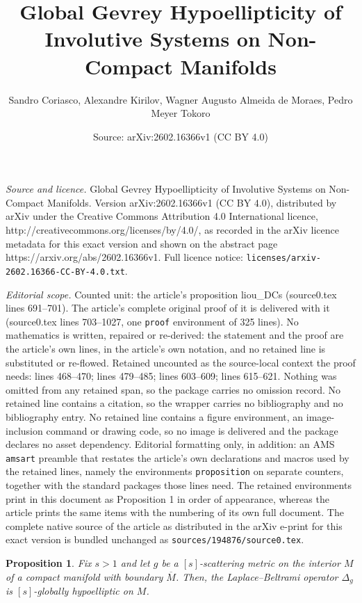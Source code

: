 \documentclass[10pt,a4paper]{amsart}
\title{Global Gevrey Hypoellipticity of Involutive Systems on Non-Compact Manifolds}
\author{Sandro Coriasco, Alexandre Kirilov, Wagner Augusto Almeida de Moraes, Pedro Meyer Tokoro}
\date{Source: arXiv:2602.16366v1 (CC BY 4.0)}
\newtheorem{proposition}{Proposition}
\begin{document}
\maketitle

\noindent\emph{Source and licence.} Global Gevrey Hypoellipticity of Involutive Systems on Non-Compact Manifolds. Version arXiv:2602.16366v1 (CC BY 4.0), distributed by arXiv under the Creative Commons Attribution 4.0 International licence, http://creativecommons.org/licenses/by/4.0/, as recorded in the arXiv licence metadata for this exact version and shown on the abstract page https://arxiv.org/abs/2602.16366v1. Full licence notice: \texttt{licenses/arxiv-2602.16366-CC-BY-4.0.txt}.\par\smallskip

\noindent\textit{Editorial scope.} Counted unit: the article's proposition liou\_DCs (source0.tex lines 691--701). The article's complete original proof of it is delivered with it (source0.tex lines 703--1027, one \texttt{proof} environment of 325 lines). No mathematics is written, repaired or re-derived: the statement and the proof are the article's own lines, in the article's own notation, and no retained line is substituted or re-flowed.  Retained uncounted as the source-local context the proof needs: lines 468--470; lines 479--485; lines 603--609; lines 615--621.  Nothing was omitted from any retained span, so the package carries no omission record.  No retained line contains a citation, so the wrapper carries no bibliography and no bibliography entry.  No retained line contains a figure environment, an image-inclusion command or drawing code, so no image is delivered and the package declares no asset dependency.  Editorial formatting only, in addition: an AMS \texttt{amsart} preamble that restates the article's own declarations and macros used by the retained lines, namely the environments \texttt{proposition} on separate counters, together with the standard packages those lines need.  The retained environments print in this document as Proposition 1 in order of appearance, whereas the article prints the same items with the numbering of its own full document.  The complete native source of the article as distributed in the arXiv e-print for this exact version is bundled unchanged as \texttt{sources/194876/source0.tex}.
	\begin{proposition}\label{gh_lapl}
		Fix $s>1$ and let $g$ be a ${[s]}$-scattering metric on the interior $M$ of a compact manifold with boundary $\overline{M}$. Then, the Laplace--Beltrami operator $\Delta_g$ is ${[s]}$-globally hypoelliptic on $M$.
	\end{proposition}
\end{document}
